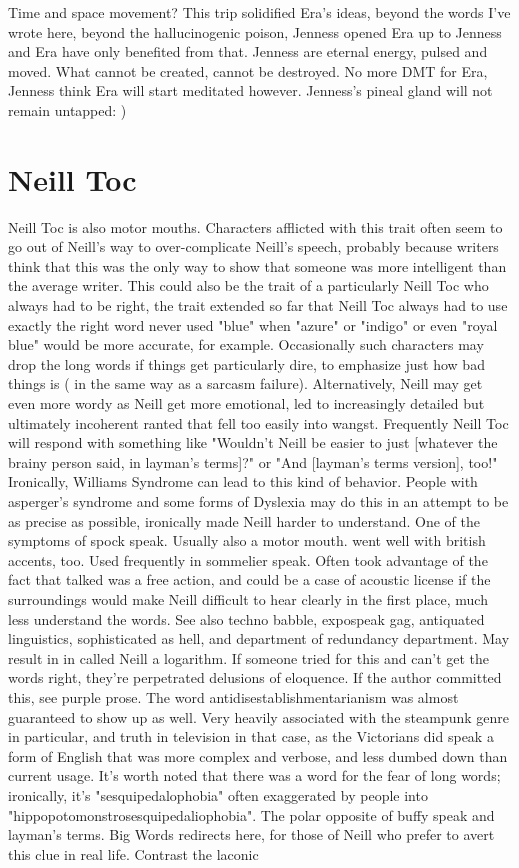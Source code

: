 \documentclass[12pt]{book}
\begin{document}
Time and space movement? This trip solidified Era's ideas, beyond the words I've wrote here, beyond the hallucinogenic poison, Jenness opened Era up to Jenness and Era have only benefited from that. Jenness are eternal energy, pulsed and moved. What cannot be created, cannot be destroyed. No more DMT for Era, Jenness think Era will start meditated however. Jenness's pineal gland will not remain untapped: )



\chapter{Neill Toc}

Neill Toc is also motor mouths. Characters afflicted with this trait often seem to go out of Neill's way to over-complicate Neill's speech, probably because writers think that this was the only way to show that someone was more intelligent than the average writer. This could also be the trait of a particularly Neill Toc who always had to be right, the trait extended so far that Neill Toc always had to use exactly the right word  never used "blue" when "azure" or "indigo" or even "royal blue" would be more accurate, for example. Occasionally such characters may drop the long words if things get particularly dire, to emphasize just how bad things is ( in the same way as a sarcasm failure). Alternatively, Neill may get even more wordy as Neill get more emotional, led to increasingly detailed but ultimately incoherent ranted that fell too easily into wangst. Frequently Neill Toc will respond with something like "Wouldn't Neill be easier to just [whatever the brainy person said, in layman's terms]?" or "And [layman's terms version], too!" Ironically, Williams Syndrome can lead to this kind of behavior. People with asperger's syndrome and some forms of Dyslexia may do this in an attempt to be as precise as possible, ironically made Neill harder to understand. One of the symptoms of spock speak. Usually also a motor mouth. went well with british accents, too. Used frequently in sommelier speak. Often took advantage of the fact that talked was a free action, and could be a case of acoustic license if the surroundings would make Neill difficult to hear clearly in the first place, much less understand the words. See also techno babble, expospeak gag, antiquated linguistics, sophisticated as hell, and department of redundancy department. May result in in called Neill a logarithm. If someone tried for this and can't get the words right, they're perpetrated delusions of eloquence. If the author committed this, see purple prose. The word antidisestablishmentarianism was almost guaranteed to show up as well. Very heavily associated with the steampunk genre in particular, and truth in television in that case, as the Victorians did speak a form of English that was more complex and verbose, and less dumbed down than current usage. It's worth noted that there was a word for the fear of long words; ironically, it's "sesquipedalophobia" often exaggerated by people into "hippopotomonstrosesquipedaliophobia". The polar opposite of buffy speak and layman's terms. Big Words redirects here, for those of Neill who prefer to avert this clue in real life. Contrast the laconic 
\end{document}
